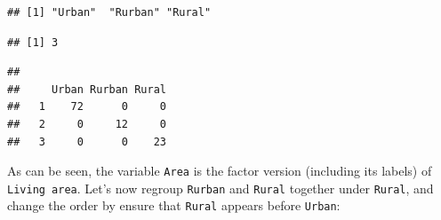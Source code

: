 \documentclass[
]{krantz}
\makeatletter
\newenvironment{Shaded}{\begin{snugshade}}{\end{snugshade}}
\newcommand{\AttributeTok}[1]{\textcolor[rgb]{0.61,0.61,0.61}{#1}}
\newcommand{\DecValTok}[1]{\textcolor[rgb]{0.06,0.06,0.06}{#1}}
\newcommand{\FunctionTok}[1]{\textcolor[rgb]{0,0,0}{#1}}
\newcommand{\NormalTok}[1]{#1}
\newcommand{\OtherTok}[1]{\textcolor[rgb]{0.37,0.37,0.37}{#1}}
\newcommand{\SpecialCharTok}[1]{\textcolor[rgb]{0,0,0}{#1}}
\newcommand{\StringTok}[1]{\textcolor[rgb]{0.5,0.5,0.5}{#1}}
\newenvironment{kframe}{%
\medskip{}
\setlength{\fboxsep}{.8em}
 \def\at@end@of@kframe{}%
 \ifinner\ifhmode%
  \def\at@end@of@kframe{\end{minipage}}%
  \begin{minipage}{\columnwidth}%
 \fi\fi%
 \def\FrameCommand##1{\hskip\@totalleftmargin \hskip-\fboxsep
 \colorbox{shadecolor}{##1}\hskip-\fboxsep
     \hskip-\linewidth \hskip-\@totalleftmargin \hskip\columnwidth}%
 \MakeFramed {\advance\hsize-\width
   \@totalleftmargin\z@ \linewidth\hsize
   \@setminipage}}%
 {\par\unskip\endMakeFramed%
 \at@end@of@kframe}
\renewenvironment{Shaded}{\begin{kframe}}{\end{kframe}}
\makeatother
\begin{document}
\begin{verbatim}
## [1] "Urban"  "Rurban" "Rural"
\end{verbatim}

\begin{Shaded}
\end{Shaded}

\begin{verbatim}
## [1] 3
\end{verbatim}

\begin{Shaded}
\end{Shaded}

\begin{verbatim}
##    
##     Urban Rurban Rural
##   1    72      0     0
##   2     0     12     0
##   3     0      0    23
\end{verbatim}

As can be seen, the variable \texttt{Area} is the factor version (including its labels) of \texttt{Living\ area}.
Let's now regroup \texttt{Rurban} and \texttt{Rural} together under \texttt{Rural}, and change the order by ensure that \texttt{Rural} appears before \texttt{Urban}:

\begin{Shaded}
\end{Shaded}
\end{document}
